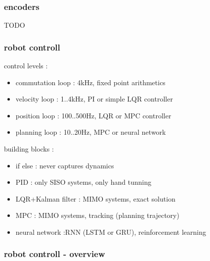 \documentclass{beamer}
\begin{document}
\begin{frame}

  \frametitle{\bf encoders}
  TODO

\end{frame}



\begin{frame}
  \frametitle{\bf robot controll}

  control levels :
  \begin{itemize}
    \item commutation loop : 4kHz, fixed point arithmetics
    \item velocity  loop   : 1..4kHz, PI or simple LQR controller
    \item position loop    : 100..500Hz, LQR or MPC controller
    \item planning loop    : 10..20Hz, MPC or neural network
  \end{itemize}

  building blocks :
  \begin{itemize}
    \item if else : never captures dynamics
    \item PID     : only SISO systems, only hand tunning
    \item LQR+Kalman filter : MIMO systems, exact solution
    \item MPC : MIMO systems, tracking (planning trajectory)
    \item neural network :RNN (LSTM or GRU), reinforcement learning
  \end{itemize}

\end{frame}


  

\begin{frame}
  
  \frametitle{\bf robot controll - overview}


\end{frame}
\end{document}
